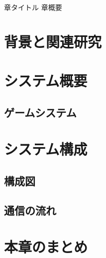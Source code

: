 \chapterhead
{章タイトル}
{章概要}


\section{背景と関連研究}
\section{システム概要}
\subsection{ゲームシステム}
\section{システム構成}
  \subsection{構成図}
  \subsection{通信の流れ}
\section{本章のまとめ}
\newpage
